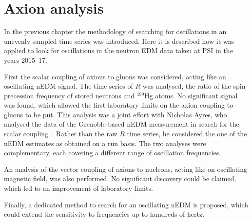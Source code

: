 \chapter{Axion analysis}
\label{ch:axion-analysis}
In the previous chapter the methodology of searching for oscillations in an unevenly sampled time series was introduced. Here it is described how it was applied to look for oscillations in the neutron EDM data taken at PSI in the years 2015--17.

First the scalar coupling of axions to gluons was considered, acting like an oscillating nEDM signal. The time series of $R$ was analysed, the ratio of the spin-precession frequency of stored neutrons and ${}^{199}$Hg atoms. No significant signal was found, which allowed the first laboratory limits on the axion coupling to gluons to be put. This analysis was a joint effort with Nicholas Ayres, who analysed the data of the Grenoble-based nEDM measurement in search for the scalar coupling~\cite{AyresThesis}. Rather than the raw $R$ time series, he considered the one of the nEDM estimates as obtained on a run basis. The two analyses were complementary, each covering a different range of oscillation frequencies.

An analysis of the vector coupling of axions to nucleons, acting like on oscillating magnetic field, was also performed. No significant discovery could be claimed, which led to an improvement of laboratory limits.

Finally, a dedicated method to search for an oscillating nEDM is proposed, which could extend the sensitivity to frequencies up to hundreds of hertz.





